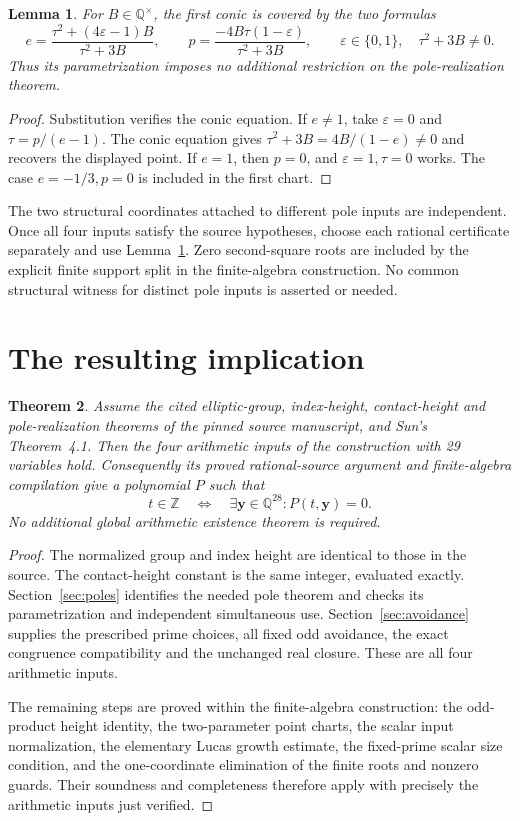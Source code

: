 \documentclass[11pt,a4paper]{article}
\newtheorem{theorem}{Theorem}[section]
\newtheorem{lemma}[theorem]{Lemma}
\theoremstyle{remark}\newtheorem{remark}[theorem]{Remark}
\newcommand{\Q}{\mathbb Q}\newcommand{\Z}{\mathbb Z}
\begin{document}
\begin{lemma}\label{lem:conic-complete}
For $B\in\Q^\times$, the first conic is covered by the two formulas
\[
 e=\frac{\tau^2+(4\varepsilon-1)B}{\tau^2+3B},\qquad
 p=\frac{-4B\tau(1-\varepsilon)}{\tau^2+3B},\qquad
 \varepsilon\in\{0,1\},\quad\tau^2+3B\ne0.
\]
Thus its parametrization imposes no additional restriction on the
pole-realization theorem.
\end{lemma}
\begin{proof}
Substitution verifies the conic equation. If $e\ne1$, take
$\varepsilon=0$ and $\tau=p/(e-1)$. The conic equation gives
$\tau^2+3B=4B/(1-e)\ne0$ and recovers the displayed point.
If $e=1$, then $p=0$, and $\varepsilon=1,\tau=0$ works.
The case $e=-1/3,p=0$ is included in the first chart.
\end{proof}

The two structural coordinates attached to different pole inputs are
independent. Once all four inputs satisfy the source hypotheses, choose
each rational certificate separately and use Lemma~\ref{lem:conic-complete}.
Zero second-square roots are included by the explicit finite support
split in the finite-algebra construction. No common structural witness
for distinct pole inputs is asserted or needed.

\section{The resulting implication}

\begin{theorem}\label{thm:dependency-conclusion}
Assume the cited elliptic-group, index-height, contact-height and
pole-realization theorems of the pinned source manuscript, and
Sun's Theorem~4.1. Then the four arithmetic inputs of the construction
with 29 variables hold. Consequently its proved rational-source
argument and finite-algebra compilation give a polynomial $P$ such that
\[
 t\in\Z\quad\Longleftrightarrow\quad
 \exists\mathbf y\in\Q^{28}:P(t,\mathbf y)=0.
\]
No additional global arithmetic existence theorem is required.
\end{theorem}
\begin{proof}
The normalized group and index height are identical to those in the
source. The contact-height constant is the same integer, evaluated
exactly. Section~\ref{sec:poles} identifies the needed pole theorem and
checks its parametrization and independent simultaneous use.
Section~\ref{sec:avoidance} supplies the prescribed prime choices,
all fixed odd avoidance, the exact congruence compatibility and the
unchanged real closure. These are all four arithmetic inputs.

The remaining steps are proved within the finite-algebra construction:
the odd-product height identity, the two-parameter point charts,
the scalar input normalization, the elementary Lucas growth estimate,
the fixed-prime scalar size condition, and the one-coordinate
elimination of the finite roots and nonzero guards. Their soundness and
completeness therefore apply with precisely the arithmetic inputs just
verified.
\end{proof}
\end{document}
